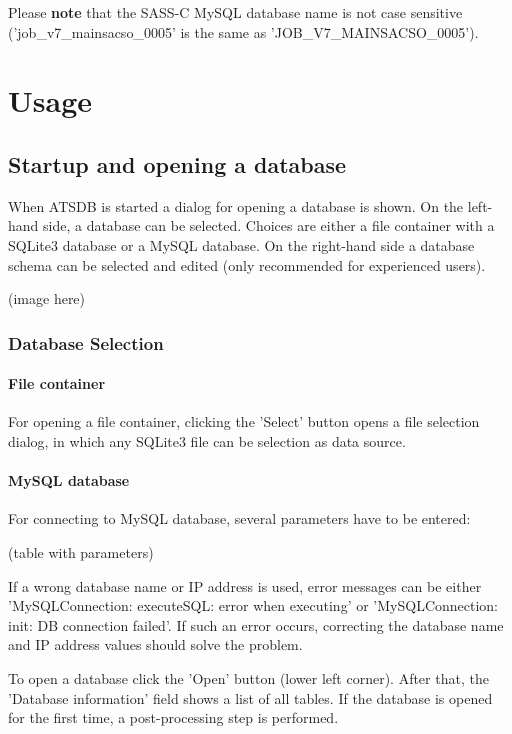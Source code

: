 \documentclass[10pt,letterpaper,extrafontsizes]{memoir}
\begin{document}
Please \textbf{note} that the SASS-C MySQL database name is not case sensitive ('job\_v7\_mainsacso\_0005' is the same as 'JOB\_V7\_MAINSACSO\_0005').

\chapter{Usage}
\label{sec:usage}

\section{Startup and opening a database}
\label{sec:startup}

When  ATSDB  is  started  a  dialog  for  opening  a  database  is  shown.  On the left-hand side, a database can be selected.  Choices are either a file container with a SQLite3 database or a MySQL database.  On the right-hand side a database schema can be selected and edited (only recommended for experienced users).

(image here)

\subsection{Database Selection}
\subsubsection{File container}
For opening a file container, clicking the 'Select' button opens a file selection dialog, in which any SQLite3 file can be selection as data source.

\subsubsection{MySQL database}
For connecting to MySQL database, several parameters have to be entered:

(table with parameters)

If  a  wrong  database  name  or  IP  address  is  used,  error  messages  can  be  either  'MySQLConnection: executeSQL: error when executing' or 'MySQLConnection:  init:  DB connection failed'.  If such an error occurs, correcting the database name and IP address values should solve the problem.

To open a database click the 'Open' button (lower left corner).  After that, the 'Database information' field shows a list of all tables. If the database is opened for the first time, a post-processing step is performed.
\end{document}
